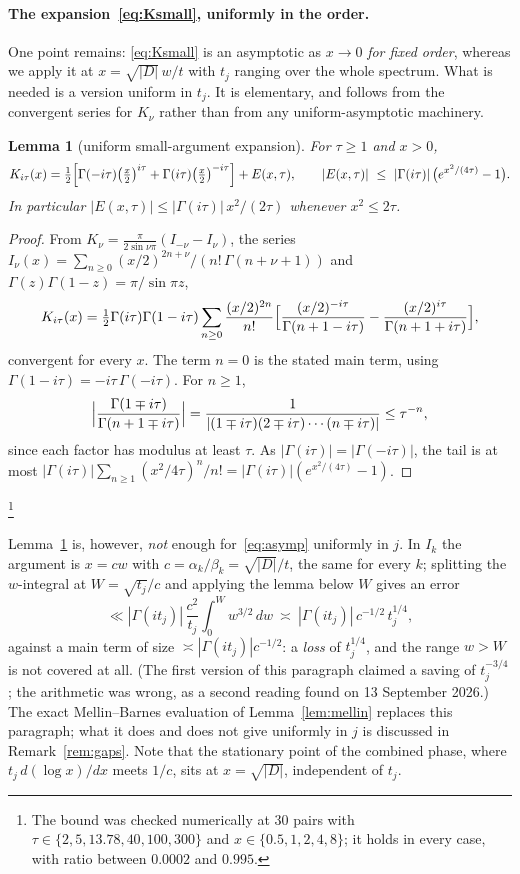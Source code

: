 \documentclass[11pt,a4paper]{article}
\newtheorem{lemma}[theorem]{Lemma}
\theoremstyle{remark}\newtheorem{remark}[theorem]{Remark}
\begin{document}
\paragraph{The expansion~\eqref{eq:Ksmall}, uniformly in the order.} One point remains: \eqref{eq:Ksmall} is an
asymptotic as $x\to0$ \emph{for fixed order}, whereas we apply it at $x=\sqrt{|D|}\,w/t$ with $t_j$ ranging over the
whole spectrum. What is needed is a version uniform in $t_j$. It is elementary, and follows from the convergent
series for $K_\nu$ rather than from any uniform-asymptotic machinery.

\begin{lemma}[uniform small-argument expansion]\label{lem:Kuniform}
For $\tau\ge1$ and $x>0$,
\[
K_{i\tau}(x)=\tfrac12\Bigl[\Gamma(-i\tau)\bigl(\tfrac x2\bigr)^{i\tau}+\Gamma(i\tau)\bigl(\tfrac x2\bigr)^{-i\tau}\Bigr]+E(x,\tau),
\qquad |E(x,\tau)|\ \le\ |\Gamma(i\tau)|\,\bigl(e^{x^2/(4\tau)}-1\bigr).
\]
In particular $|E(x,\tau)|\le|\Gamma(i\tau)|\,x^2/(2\tau)$ whenever $x^2\le2\tau$.
\end{lemma}
\begin{proof}
From $K_\nu=\frac\pi{2\sin\nu\pi}(I_{-\nu}-I_\nu)$, the series
$I_\nu(x)=\sum_{n\ge0}(x/2)^{2n+\nu}/(n!\,\Gamma(n+\nu+1))$ and $\Gamma(z)\Gamma(1-z)=\pi/\sin\pi z$,
\[
K_{i\tau}(x)=\tfrac12\Gamma(i\tau)\Gamma(1-i\tau)\sum_{n\ge0}\frac{(x/2)^{2n}}{n!}
\Bigl[\frac{(x/2)^{-i\tau}}{\Gamma(n+1-i\tau)}-\frac{(x/2)^{i\tau}}{\Gamma(n+1+i\tau)}\Bigr],
\]
convergent for every $x$. The term $n=0$ is the stated main term, using $\Gamma(1-i\tau)=-i\tau\,\Gamma(-i\tau)$. For
$n\ge1$,
\[
\Bigl|\frac{\Gamma(1\mp i\tau)}{\Gamma(n+1\mp i\tau)}\Bigr|=\frac1{|(1\mp i\tau)(2\mp i\tau)\cdots(n\mp i\tau)|}\le\tau^{-n},
\]
since each factor has modulus at least $\tau$. As $|\Gamma(i\tau)|=|\Gamma(-i\tau)|$, the tail is at most
$|\Gamma(i\tau)|\sum_{n\ge1}(x^2/4\tau)^n/n!=|\Gamma(i\tau)|(e^{x^2/(4\tau)}-1)$.
\end{proof}

\footnote{The bound was checked numerically at $30$ pairs with $\tau\in\{2,5,13.78,40,100,300\}$ and
$x\in\{0.5,1,2,4,8\}$; it holds in every case, with ratio between $0.0002$ and $0.995$.}

Lemma~\ref{lem:Kuniform} is, however, \emph{not} enough for~\eqref{eq:asymp} uniformly in $j$. In $I_k$ the
argument is $x=cw$ with $c=\alpha_k/\beta_k=\sqrt{|D|}/t$, the same for every $k$; splitting the $w$-integral at
$W=\sqrt{t_j}/c$ and applying the lemma below $W$ gives an error
\[
\ll|\Gamma(it_j)|\,\frac{c^2}{t_j}\int_0^Ww^{3/2}\,dw\ \asymp\ |\Gamma(it_j)|\,c^{-1/2}\,t_j^{1/4},
\]
against a main term of size $\asymp|\Gamma(it_j)|c^{-1/2}$: a \emph{loss} of $t_j^{1/4}$, and the range $w>W$ is not
covered at all. (The first version of this paragraph claimed a saving of $t_j^{-3/4}$; the arithmetic was wrong, as a
second reading found on 13 September 2026.) The exact Mellin--Barnes evaluation of Lemma~\ref{lem:mellin} replaces
this paragraph; what it does and does not give uniformly in $j$ is discussed in Remark~\ref{rem:gaps}. Note that the
stationary point of the combined phase, where $t_j\,d(\log x)/dx$ meets $1/c$, sits at $x=\sqrt{|D|}$, independent of
$t_j$.
\end{document}
